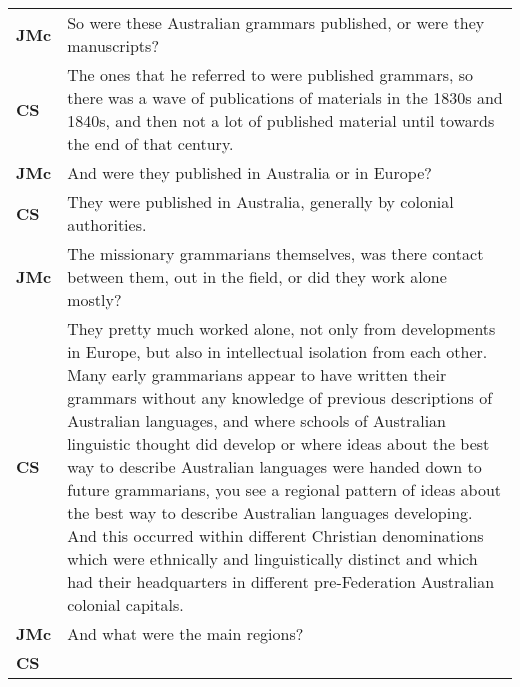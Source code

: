 \documentclass[12pt]{article}
\begin{document}
\begin{flushleft}
\begin{supertabular}{m{0.24415985in}m{5.89766in}}
\textbf{JMc}\newline
 &
So were these Australian grammars published, or were they manuscripts?\\
\textbf{CS}\newline
 &
The ones that he referred to were published grammars, so there was a wave of publications of materials in the 1830s and 1840s, and then not a lot of published material until towards the end of that century.\\
\textbf{JMc}\newline
 &
And were they published in Australia or in Europe?\\
\textbf{CS}\newline
 &
They were published in Australia, generally by colonial authorities.\\
\textbf{JMc}\newline
 &
The missionary grammarians themselves, was there contact between them, out in the field, or did they work alone mostly?\\
\textbf{CS}\newline
 &
They pretty much worked alone, not only from developments in Europe, but also in intellectual isolation from each other. Many early grammarians appear to have written their grammars without any knowledge of previous descriptions of Australian languages, and where schools of Australian linguistic thought did develop or where ideas about the best way to describe Australian languages were handed down to future grammarians, you see a regional pattern of ideas about the best way to describe Australian languages developing. And this occurred within different Christian denominations which were ethnically and linguistically distinct and which had their headquarters in different pre-Federation Australian colonial capitals.\\
\textbf{JMc}\newline
 &
And what were the main regions?\\
\textbf{CS}\newline
 &

\end{supertabular}
\end{flushleft}
\end{document}
